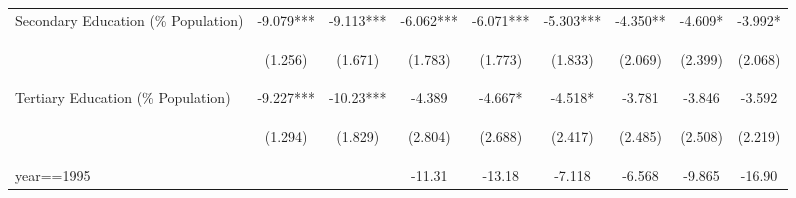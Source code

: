 \begin{landscape}
\begin{table}[htpb!]
\begin{center}
\begin{tabular}{lcccccccc}
Secondary Education (\% Population) &-9.079***&-9.113***&-6.062***&-6.071***&-5.303***&-4.350**&-4.609*&-3.992*\\
&\begin{footnotesize}(1.256)\end{footnotesize}&\begin{footnotesize}(1.671)\end{footnotesize}&\begin{footnotesize}(1.783)\end{footnotesize}&\begin{footnotesize}(1.773)\end{footnotesize}&\begin{footnotesize}(1.833)\end{footnotesize}&\begin{footnotesize}(2.069)\end{footnotesize}&\begin{footnotesize}(2.399)\end{footnotesize}&\begin{footnotesize}(2.068)\end{footnotesize}\\
Tertiary Education (\% Population) &-9.227***&-10.23***&-4.389&-4.667*&-4.518*&-3.781&-3.846&-3.592\\
&\begin{footnotesize}(1.294)\end{footnotesize}&\begin{footnotesize}(1.829)\end{footnotesize}&\begin{footnotesize}(2.804)\end{footnotesize}&\begin{footnotesize}(2.688)\end{footnotesize}&\begin{footnotesize}(2.417)\end{footnotesize}&\begin{footnotesize}(2.485)\end{footnotesize}&\begin{footnotesize}(2.508)\end{footnotesize}&\begin{footnotesize}(2.219)\end{footnotesize}\\
year==1995&&&-11.31&-13.18&-7.118&-6.568&-9.865&-16.90\\

\end{tabular}
\end{center}
\end{table}
\end{landscape}
